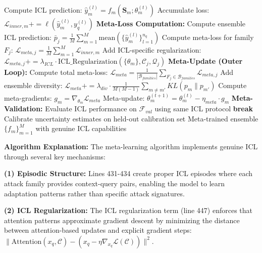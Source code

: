 \documentclass[journal]{IEEEtran}
\begin{document}
\begin{algorithm}[t]
\begin{algorithmic}[1]
                    \STATE Compute ICL prediction: $\hat{y}_m^{(l)} = f_m(\mathbf{S}_m; \theta_m^{(t)})$
                    \STATE Accumulate loss: $\mathcal{L}_{inner,m} += \ell(\hat{y}_m^{(l)}, y_q^{(l)})$
                \ENDFOR
            \ENDFOR
            \STATE \textbf{Meta-Loss Computation:}
            \STATE Compute ensemble ICL prediction: $\bar{p}_j = \frac{1}{M} \sum_{m=1}^M \text{mean}(\{\hat{y}_m^{(l)}\}_{l=1}^{n_q})$
            \STATE Compute meta-loss for family $F_j$: $\mathcal{L}_{meta,j} = \frac{1}{M} \sum_{m=1}^M \mathcal{L}_{inner,m}$
            \STATE Add ICL-specific regularization: $\mathcal{L}_{meta,j} += \lambda_{ICL} \cdot \text{ICL\_Regularization}(\{\theta_m\}, \mathcal{C}_j, \mathcal{Q}_j)$
            \STATE {}
            \STATE {}
        \ENDFOR
        \STATE \textbf{Meta-Update (Outer Loop):}
        \STATE Compute total meta-loss: $\mathcal{L}_{meta} = \frac{1}{|\mathcal{B}_{families}|} \sum_{F_j \in \mathcal{B}_{families}} \mathcal{L}_{meta,j}$
        \STATE Add ensemble diversity: $\mathcal{L}_{meta} += \lambda_{div} \cdot \frac{1}{M(M-1)} \sum_{m \neq m'} KL(p_m \| p_{m'})$
            \STATE Compute meta-gradients: $g_m = \nabla_{\theta_m} \mathcal{L}_{meta}$
            \STATE Meta-update: $\theta_m^{(t+1)} = \theta_m^{(t)} - \eta_{meta} \cdot g_m$
        \ENDFOR
    \ENDFOR
    \STATE \textbf{Meta-Validation:}
    \STATE Evaluate ICL performance on $\mathcal{F}_{val}$ using same ICL protocol
        \STATE \textbf{break} 
    \ENDIF
\ENDFOR
\STATE Calibrate uncertainty estimates on held-out calibration set
\RETURN Meta-trained ensemble $\{f_m\}_{m=1}^M$ with genuine ICL capabilities
\end{algorithmic}
\end{algorithm}

\textbf{Algorithm Explanation:} The meta-learning algorithm implements genuine ICL through several key mechanisms:

\textbf{(1) Episodic Structure:} Lines 431-434 create proper ICL episodes where each attack family provides context-query pairs, enabling the model to learn adaptation patterns rather than specific attack signatures.

\textbf{(2) ICL Regularization:} The ICL regularization term (line 447) enforces that attention patterns approximate gradient descent by minimizing the distance between attention-based updates and explicit gradient steps: $\|\text{Attention}(x_q, \mathcal{C}) - (x_q - \eta \nabla_{x_q} \mathcal{L}(\mathcal{C}))\|^2$.
\end{document}
